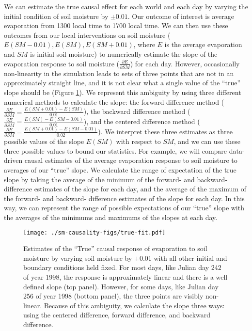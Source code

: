 We can estimate the true causal effect for each world and each day by
varying the initial condition of soil moisture by $\pm0.01$. Our
outcome of interest is average evaporation from 1300 local time to
1700 local time. We can then use these outcomes from our local
interventions on soil moisture ($E(SM-0.01), E(SM), E(SM+0.01)$, where
$E$ is the average evaporation and $SM$ is initial soil moisture) to
numerically estimate the slope of the evaporation response to soil
moisture ($\frac{\partial E}{\partial SM}$) for each day. However,
occasionally non-linearity in the simulation leads to sets of three
points that are not in an approximately straight line, and it is not
clear what a single value of the ``true'' slope should be (Figure
\ref{fig:true-fit}). We represent this ambiguity by using three
different numerical methods to calculate the slope: the forward
difference method ($\frac{\partial E}{\partial SM} = \frac{E(SM+0.01)
  - E(SM)}{0.01}$), the backward difference method ($\frac{\partial
  E}{\partial SM} = \frac{E(SM) - E(SM-0.01)}{0.01}$), and the
centered difference method ($\frac{\partial E}{\partial SM} =
\frac{E(SM+0.01) - E(SM-0.01)}{0.02}$). We interpret these three
estimates as three possible values of the slope $E(SM)$ with respect
to $SM$, and we can use these three possible values to bound our
statistics. For example, we will compare data-driven causal estimates
of the average evaporation response to soil moisture to averages of
our ``true'' slope. We calculate the range of expectation of the true
slope by taking the average of the minimum of the forward- and
backward- difference estimates of the slope for each day, and the
average of the maximum of the forward- and backward- difference
estimates of the slope for each day. In this way, we can represent the
range of possible expectations of our ``true'' slope with the averages
of the minimums and maximums of the slopes at each day.

\begin{figure}
  \texttt{[image: ./sm-causality-figs/true-fit.pdf]}
  \caption{Estimates of the ``True'' causal response of evaporation to
    soil moisture by varying soil moisture by $\pm0.01$ with all other
    initial and boundary conditions held fixed. For most days, like
    Julian day 242 of year 1998, the response is approximately linear
    and there is a well defined slope (top panel). However, for some
    days, like Julian day 256 of year 1998 (bottom panel), the three
    points are visibly non-linear. Because of this ambiguity, we
    calculate the slope three ways: using the centered difference,
    forward difference, and backward difference.}\label{fig:true-fit}
\end{figure}

